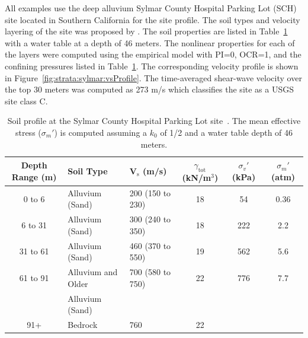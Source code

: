 \documentclass[12pt,oneside]{book}
\begin{document}
All examples use the deep alluvium Sylmar County Hospital Parking Lot (SCH) site located in Southern
California for the site profile.  The soil types and velocity layering of the site was proposed by
\citet{chang:96}.  The soil properties are listed in Table~\ref{tab:strata:sylmar:soil} with a water
table at a depth of 46 meters. The nonlinear properties for each of the layers were computed using
the \citet{darendeli:01} empirical model with PI=0, OCR=1, and the confining pressures listed in
Table~\ref{tab:strata:sylmar:soil}.  The corresponding velocity profile is shown in
Figure~\ref{fig:strata:sylmar:vsProfile}. The time-averaged shear-wave velocity over the top 30
meters was computed as 273 m/s which classifies the site as a USGS site class C.

\begin{table}
    \centering
    \begin{tabular}{cllccc}
        \hline\hline
        \textbf{Depth Range} (m) & \textbf{Soil Type} & \textbf{V$_\text{s}$} (m/s) &
        \textbf{$\gamma_\text{tot}$} (kN/m$^3$) & \textbf{$\sigma_v'$} (kPa) & \textbf{$\sigma_{m}'$} (atm) \\
        \hline
        0 to 6 & Alluvium (Sand) & 200 (150 to 230) & 18 & 54 & 0.36\\
        6 to 31 & Alluvium (Sand) & 300 (240 to 350) & 18 & 222 & 2.2 \\
        31 to 61 & Alluvium (Sand) & 460 (370 to 550) & 19 & 562 & 5.6 \\
        61 to 91 & Alluvium and Older & 700 (580 to 750) & 22 & 776 & 7.7 \\
                 & Alluvium (Sand) \\
        91+ & Bedrock & 760 & 22 \\
        \hline\hline
    \end{tabular}
    \caption{Soil profile at the Sylmar County Hospital Parking Lot site~\citep{chang:96}. The mean
        effective stress ($\sigma_{m}'$) is computed assuming a $k_0$ of 1/2 and a water table depth of 46
    meters.}
    \label{tab:strata:sylmar:soil}
\end{table}
\end{document}
